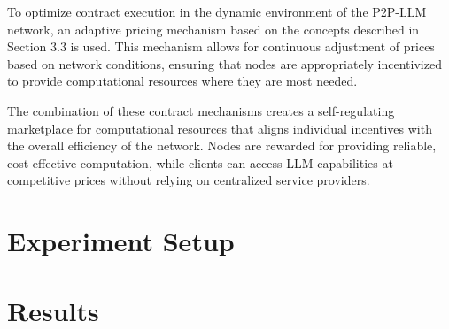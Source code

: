 \documentclass[preprint,twoside,11pt]{article}
\begin{document}
To optimize contract execution in the dynamic environment of the P2P-LLM network, an adaptive pricing mechanism based on the concepts described in Section 3.3 is used. This mechanism allows for continuous adjustment of prices based on network conditions, ensuring that nodes are appropriately incentivized to provide computational resources where they are most needed.

The combination of these contract mechanisms creates a self-regulating marketplace for computational resources that aligns individual incentives with the overall efficiency of the network. Nodes are rewarded for providing reliable, cost-effective computation, while clients can access LLM capabilities at competitive prices without relying on centralized service providers.

\section{Experiment Setup}

\section{Results}

%
\newpage

\appendix
\end{document}
